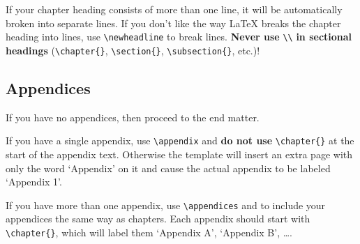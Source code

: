 If your chapter heading consists of more than one line, it will be automatically broken into separate lines.
If you don't like the way LaTeX breaks the chapter heading into lines, use \verb+\newheadline+ to break lines.
\textbf{Never use} \verb+\\+ \textbf{in sectional headings} (\verb+\chapter{}+, \verb+\section{}+, \verb+\subsection{}+, etc.)!
%
%
%

\subsection{Appendices} %
%

If you have no appendices, then proceed to the end matter.

If you have a single appendix, use \verb+\appendix+ and \textbf{do not use}
\verb+\chapter{}+ at the start of the appendix text.
Otherwise the template will insert an extra page with only the word
`Appendix' on it and cause the actual appendix to be labeled `Appendix 1'.

If you have more than one appendix, use \verb+\appendices+
and \verb++ to include your appendices the same way as chapters.
Each appendix should start with \verb+\chapter{}+, which will label them `Appendix A', `Appendix B', \ldots.

